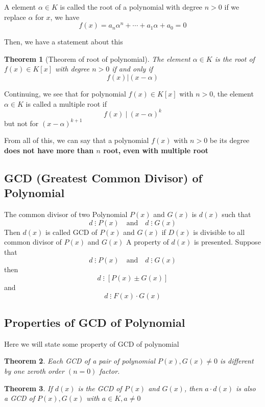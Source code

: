 \documentclass{book}
\newtheorem{Theorem}{Theorem}[section]
\numberwithin{identity}{subsection}
\numberwithin{Rule}{subsection}
\numberwithin{Theorem}{subsection}
\numberwithin{Definition}{subsection}
\begin{document}
A element $\alpha\in K$ is called the root of a polynomial with degree $n>0$ if we replace $\alpha$ for $x$, we have $$f(x)=a_{n}\alpha^{n} + \cdots + a_{1}\alpha + a_{0}=0$$

Then, we have a statement about this

\begin{Theorem}[Theorem of root of polynomial]
    The element $\alpha \in K$ is the root of $f(x)\in K[x]$ with degree $n >0$ if and only if $$f(x) | (x-\alpha)$$
\end{Theorem}

Continuing, we see that for polynomial $f(x)\in K[x]$ with $n >0$, the element $\alpha \in K$ is called a multiple root if $$f(x)\:|\: (x-\alpha)^k$$ but not for $(x-\alpha)^{k+1}$

From all of this, we can say that a polynomial $f(x)$ with $n>0$ be its degree \textbf{does not have more than $n$ root, even with multiple root}

\subsection{GCD (Greatest Common Divisor) of Polynomial}

The common divisor of two Polynomial $P(x)$ and $G(x)$ is $d(x)$ such that $$d
\mathrel{\vdots} P(x)\quad \text{and} \quad d \mathrel{\vdots} G(x)$$
Then $d(x)$ is called GCD of $P(x)$ and $G(x)$ if $D(x)$ is divisible to all common divisor of $P(x)$ and $G(x)$ 
A property of $d(x)$ is presented. Suppose that $$d
\mathrel{\vdots} P(x)\quad \text{and} \quad d \mathrel{\vdots} G(x)$$ then $$d \mathrel{\vdots} [P(x)\pm G(x)]$$ and $$d\mathrel{\vdots}F(x)\cdot G(x)$$

\subsection{Properties of GCD of Polynomial}

Here we will state some property of GCD of polynomial

\begin{Theorem}

    Each GCD of a pair of polynomial $P(x), G(x)\neq 0$ is different by one zeroth order $(n=0)$ factor. 
\end{Theorem}

\begin{Theorem}
    If $d(x)$ is the GCD of $P(x)$ and $G(x)$, then $a\cdot d(x)$ is also a GCD of $P(x), G(x)$ with $a \in K, a \neq 0$
\end{Theorem}
\end{document}
